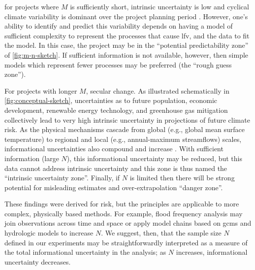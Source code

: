 \documentclass[
  draft,
  linenumbers
]{agujournal2019}
\begin{document}
  for projects where $M$ is sufficiently short, intrinsic uncertainty is low and cyclical climate variability is dominant over the project planning period \citep{Jain:2001hz,Hodgkins:2017hw}.
However, one's ability to identify and predict this variability depends on having a model of sufficient complexity to represent the processes that cause \gls{lfv}, and the data to fit the model.
In this case, the project may be in the ``potential predictability zone'' of \cref{fig:m-n-sketch}.
If sufficient information is not available, however, then simple models which represent fewer processes may be preferred (the ``rough guess zone'').

For projects with longer $M$,   secular change.
As illustrated schematically in \cref{fig:conceptual-sketch}, uncertainties as to future population, economic development, renewable energy technology, and greenhouse gas mitigation collectively lead to very high intrinsic uncertainty in projections of future climate risk.
As the physical mechanisms cascade from global (e.g.\@\xspace, global mean surface temperature) to regional  \citep[e.g.\@\xspace, storm track position][]{Barnes:2015gl} and local (e.g.\@\xspace, annual-maximum streamflows) scales, informational uncertainties also compound and increase \citep{Dittes:2017he}.
With sufficient information (large $N$), this informational uncertainty may be reduced, but this data cannot address intrinsic uncertainty and this zone is thus named the ``intrinsic uncertainty zone''.
Finally, if $N$ is limited then there will be strong potential for misleading estimates and over-extrapolation \add{(i.e.\xspace a }``danger zone''.

These findings were derived    for  risk, but the principles are applicable to more complex, physically based methods.
For example, flood frequency analysis may join observations across time and space \citep{Lima:2016kd,Merz:2008eh} or apply model chains based on \glspl{gcm} and hydrologic models \citep[see][]{Merz:2014gf} to increase $N$.
We suggest, then, that the sample size $N$ defined in our experiments may be straightforwardly interpreted as a measure of the total informational uncertainty in the analysis; as $N$ increases, informational uncertainty decreases.
\end{document}

